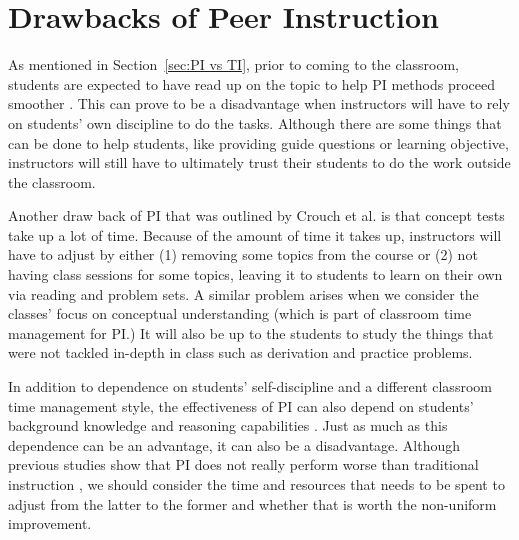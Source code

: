 \section{Drawbacks of Peer Instruction}
As mentioned in Section~\ref{sec:PI vs TI}, prior to coming to the classroom, students are expected to have read up on the topic to help PI methods proceed smoother \cite{mazur1999,crouch2001peer}.
This can prove to be a disadvantage when instructors will have to rely on students' own discipline to do the tasks.
Although there are some things that can be done to help students, like providing guide questions or learning objective, instructors will still have to ultimately trust their students to do the work outside the classroom. 

Another draw back of PI that was outlined by Crouch et al. \cite{crouch2001peer} is that concept tests take up a lot of time.
Because of the amount of time it takes up, instructors will have to adjust by either (1) removing some topics from the course or (2) not having class sessions for some topics, leaving it to students to learn on their own via reading and problem sets.
A similar problem arises when we consider the classes' focus on conceptual understanding (which is part of classroom time management for PI.)
It will also be up to the students to study the things that were not tackled in-depth in class such as derivation and practice problems.

In addition to dependence on students' self-discipline and a different classroom time management style, the effectiveness of PI can also depend on students' background knowledge and reasoning capabilities \cite{lasry2008peer}.
Just as much as this dependence can be an advantage, it can also be a disadvantage.
Although previous studies show that PI does not really perform worse than traditional instruction \cite{crouch2001peer,lasry2008peer}, we should consider the time and resources that needs to be spent to adjust from the latter to the former and whether that is worth the non-uniform improvement.


